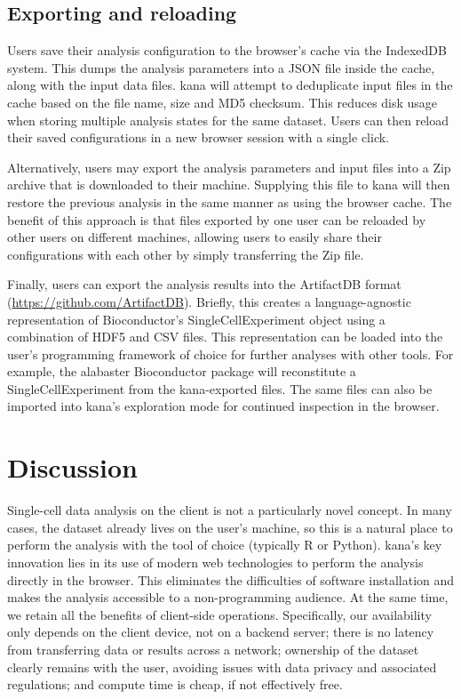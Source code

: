\documentclass{article}
\begin{document}
\subsection{Exporting and reloading}

Users save their analysis configuration to the browser's cache via the IndexedDB system.
This dumps the analysis parameters into a JSON file inside the cache, along with the input data files.
kana will attempt to deduplicate input files in the cache based on the file name, size and MD5 checksum.
This reduces disk usage when storing multiple analysis states for the same dataset.
Users can then reload their saved configurations in a new browser session with a single click.

Alternatively, users may export the analysis parameters and input files into a Zip archive that is downloaded to their machine.
Supplying this file to kana will then restore the previous analysis in the same manner as using the browser cache.
The benefit of this approach is that files exported by one user can be reloaded by other users on different machines,
allowing users to easily share their configurations with each other by simply transferring the Zip file.

Finally, users can export the analysis results into the ArtifactDB format (\url{https://github.com/ArtifactDB}).
Briefly, this creates a language-agnostic representation of Bioconductor's SingleCellExperiment object using a combination of HDF5 and CSV files.
This representation can be loaded into the user's programming framework of choice for further analyses with other tools.
For example, the alabaster Bioconductor package \cite{lun2023alabaster} will reconstitute a SingleCellExperiment from the kana-exported files.
The same files can also be imported into kana's exploration mode for continued inspection in the browser.

\section{Discussion}

Single-cell data analysis on the client is not a particularly novel concept.
In many cases, the dataset already lives on the user's machine, so this is a natural place to perform the analysis with the tool of choice (typically R or Python).
kana's key innovation lies in its use of modern web technologies to perform the analysis directly in the browser.
This eliminates the difficulties of software installation and makes the analysis accessible to a non-programming audience.
At the same time, we retain all the benefits of client-side operations.
Specifically, our availability only depends on the client device, not on a backend server;
there is no latency from transferring data or results across a network;
ownership of the dataset clearly remains with the user, avoiding issues with data privacy and associated regulations;
and compute time is cheap, if not effectively free.
\end{document}
